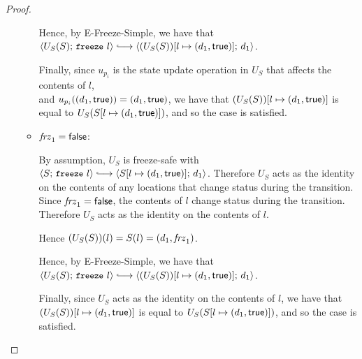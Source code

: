 \begin{proof}
\begin{itemize}
\begin{itemize}
          Hence, by {\sc E-Freeze-Simple}, we have that
          $\config{U_S(S)}{\freeze{l}} \parstepsto \\
          \config{\extS{(U_S(S))}{l}{d_1}{\frozentrue}}{d_1}$.

          Finally, since $u_{p_i}$ is the state update operation in
          $U_S$ that affects the contents of $l$, \\ and
          $u_{p_i}((d_1, \textsf{true})) =
          (d_1, \textsf{true})$, we have that
          $(U_S(S))[l \mapsto (d_1, \textsf{true})]$ is equal to
          $U_S(S[l \mapsto (d_1, \textsf{true})])$, and so the case is
          satisfied.

        \item $\mathit{frz}_1 = \textsf{false}$:

          By assumption, $U_S$ is freeze-safe with
          $\config{S}{\freeze{l}} \parstepsto
          \config{\extS{S}{l}{d_1}{\frozentrue}}{d_1}$.  Therefore
          $U_S$ acts as the identity on the contents of any locations
          that change status during the transition.  Since $\mathit{frz}_1
          = \textsf{false}$, the contents of $l$ change status during
          the transition.  Therefore $U_S$ acts as the identity on the
          contents of $l$.

          Hence $(U_S(S))(l) = S(l) = (d_1, \mathit{frz}_1)$.

          Hence, by {\sc E-Freeze-Simple}, we have that
          $\config{U_S(S)}{\freeze{l}} \parstepsto \\
          \config{\extS{(U_S(S))}{l}{d_1}{\frozentrue}}{d_1}$.

          Finally, since $U_S$ acts as the identity on the contents of
          $l$, we have that $(U_S(S))[l \mapsto (d_1, \textsf{true})]$ is
          equal to $U_S(S[l \mapsto (d_1, \textsf{true})])$, and so the
          case is satisfied.
      \end{itemize}

  \end{itemize}
\end{proof}
